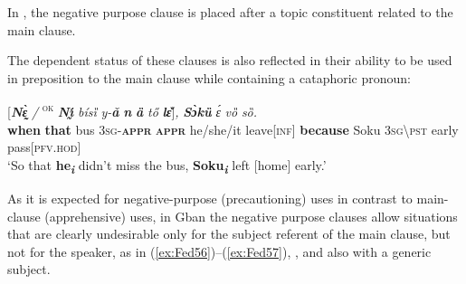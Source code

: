 \documentclass[output=paper,colorlinks,citecolor=brown
]{langscibook}
\begin{document}
 In , the negative purpose clause is placed after a topic constituent related to the main clause.

\ea \label{ex:Fed60}
\z
\z


 The dependent status of these clauses is also reflected in their ability to be used in preposition to the main clause while containing a cataphoric pronoun:

\ea \label{ex:Fed61}
\gll \textup{[}\textit{\textbf{Nɛ̰̀}} \textit{/} \textsuperscript{\textsc{ok}} \textit{\textbf{Nı̰́}} \textit{bísȉ} \textit{y-\textbf{ǎ}} \textit{\textbf{n{\ù}}} \textbf{\textit{ȁ}} \textit{tő} \textit{\textbf{lɛ̌}}\textup{]}\textit{,} \textbf{\textit{Sɔ̀kȕ}} \textit{ɛ́} \textit{vȍ} \textit{sȍ.} \\
\textbf{when} {} {} \textbf{that} bus \textsc{3sg-\textbf{appr}} \textsc{\textbf{appr}} he/she/it leave[\textsc{inf}] \textbf{because} Soku \textsc{3sg\backslash pst} early pass[\textsc{pfv.hod}] \\
\glt `So that \textbf{he}\textsubscript{\textit{\textbf{i}}} didn't miss the bus, \textbf{Soku}\textsubscript{\textit{\textbf{i}}} left [home] early.'
\z


 As it is expected for negative-purpose (precautioning) uses in contrast to main-clause (apprehensive) uses, in Gban the negative purpose clauses allow situations that are clearly undesirable only for the subject referent of the main clause, but not for the speaker, as in (\ref{ex:Fed56})--(\ref{ex:Fed57}), , and also  with a generic subject.
\end{document}
